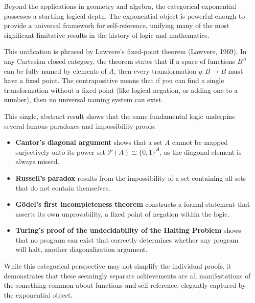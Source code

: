 \vspace{1em}

\begin{tcolorbox}[
  colback=gray!5,
  colframe=gray!50,
  boxrule=0.5pt,
  arc=2pt,
  left=10pt,
  right=10pt,
  top=10pt,
  bottom=10pt,
  title={\centering\large\textbf{Lawvere's Fixed-Point Theorem and the Limits of Self-Reference}}
]

Beyond the applications in geometry and algebra, the categorical exponential possesses a startling logical depth. The exponential object is powerful enough to provide a universal framework for self-reference, unifying many of the most significant limitative results in the history of logic and mathematics. \par

This unification is phrased by Lawvere's fixed-point theorem (Lawvere, 1969). In any Cartesian closed category, the theorem states that if a space of functions $B^A$ can be fully \QSOpen{}named\QSClose{} by elements of $A$, then every transformation $g: B \to B$ must have a fixed point. The contrapositive means that if you can find a single transformation without a fixed point (like logical negation, or adding one to a number), then no universal naming system can exist. \par

This single, abstract result shows that the same fundamental logic underpins several famous paradoxes and impossibility proofs:

\begin{itemize}[leftmargin=*,itemsep=3pt]
\item \textbf{Cantor's diagonal argument} shows that a set $A$ cannot be mapped surjectively onto its power set $\mathcal{P}(A) \cong \{0, 1\}^A$, as the \QSOpen{}diagonal\QSClose{} element is always missed.

\item \textbf{Russell's paradox} results from the impossibility of a set containing all sets that do not contain themselves.

\item \textbf{Gödel's first incompleteness theorem} constructs a formal statement that asserts its own unprovability, a fixed point of negation within the logic.

\item \textbf{Turing's proof of the undecidability of the Halting Problem} shows that no program can exist that correctly determines whether any program will halt, another diagonalization argument. \par
\end{itemize}

While this categorical perspective may not simplify the individual proofs, it demonstrates that these seemingly separate achievements are all manifestations of the something common about functions and self-reference, elegantly captured by the exponential object.

\end{tcolorbox}
